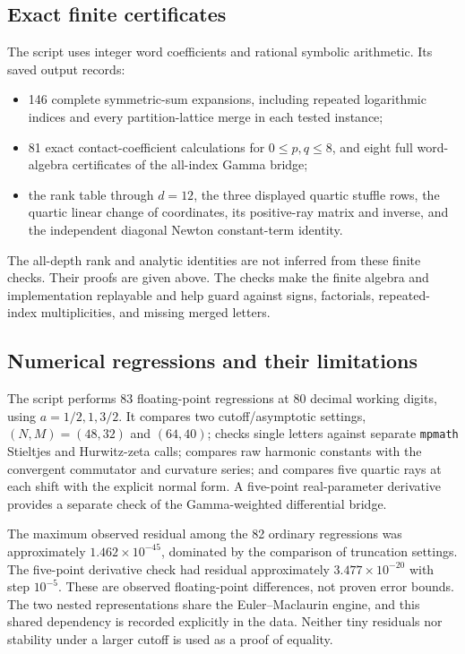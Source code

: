 \documentclass[11pt]{article}
\numberwithin{equation}{section}
\theoremstyle{definition}
\newcommand{\src}[1]{\texttt{\small\detokenize{#1}}}
\begin{document}
\subsection{Exact finite certificates}
The script \src{code/verify_exact.py} uses integer word coefficients
and rational symbolic arithmetic. Its saved output records:
\begin{itemize}[itemsep=2pt]
\item 146 complete symmetric-sum expansions, including repeated logarithmic
indices and every partition-lattice merge in each tested instance;
\item 81 exact contact-coefficient calculations for $0\le p,q\le8$,
and eight full word-algebra certificates of the all-index Gamma bridge;
\item the rank table through $d=12$, the three displayed quartic stuffle
rows, the quartic linear change of coordinates, its positive-ray matrix
and inverse, and the independent diagonal Newton constant-term identity.
\end{itemize}
The all-depth rank and analytic identities are not inferred from these
finite checks. Their proofs are given above. The checks make the finite
algebra and implementation replayable and help guard against signs,
factorials, repeated-index multiplicities, and missing merged letters.

\subsection{Numerical regressions and their limitations}
The script \src{code/verify_numeric.py} performs 83 floating-point
regressions at 80 decimal working digits, using $a=1/2,1,3/2$.
It compares two cutoff/asymptotic settings, $(N,M)=(48,32)$ and $(64,40)$;
checks single letters against separate \texttt{mpmath} Stieltjes and
Hurwitz-zeta calls; compares raw harmonic constants with the convergent
commutator and curvature series; and compares five quartic rays at each
shift with the explicit normal form. A five-point real-parameter derivative
provides a separate check of the Gamma-weighted differential bridge.

The maximum observed residual among the 82 ordinary regressions was
approximately $1.462\times10^{-45}$, dominated by the comparison of
truncation settings. The five-point derivative check had residual
approximately $3.477\times10^{-20}$ with step $10^{-5}$. These are
observed floating-point differences, not proven error bounds. The two
nested representations share the Euler--Maclaurin engine, and this shared
dependency is recorded explicitly in the data. Neither tiny residuals nor
stability under a larger cutoff is used as a proof of equality.
\end{document}
